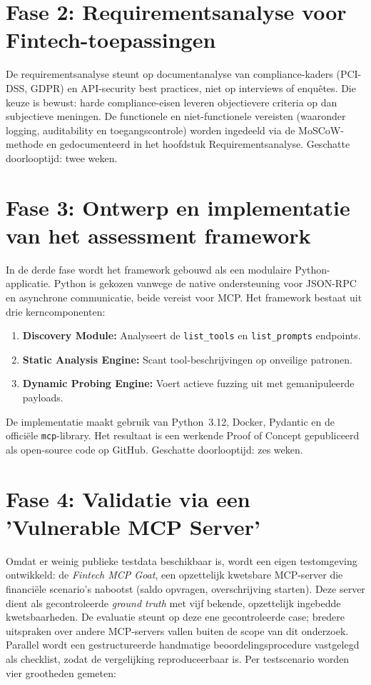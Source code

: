 \section{Fase 2: Requirementsanalyse voor Fintech-toepassingen}

De requirementsanalyse steunt op documentanalyse van compliance-kaders (PCI-DSS, GDPR) en API-security best practices, niet op interviews of enquêtes. Die keuze is bewust: harde compliance-eisen leveren objectievere criteria op dan subjectieve meningen. De functionele en niet-functionele vereisten (waaronder logging, auditability en toegangscontrole) worden ingedeeld via de MoSCoW-methode en gedocumenteerd in het hoofdstuk Requirementsanalyse. Geschatte doorlooptijd: twee weken.

\section{Fase 3: Ontwerp en implementatie van het assessment framework}

In de derde fase wordt het framework gebouwd als een modulaire Python-applicatie. Python is gekozen vanwege de native ondersteuning voor JSON-RPC en asynchrone communicatie, beide vereist voor MCP. Het framework bestaat uit drie kerncomponenten:

\begin{enumerate}
    \item \textbf{Discovery Module:} Analyseert de \texttt{list\_tools} en \texttt{list\_prompts} endpoints.
    \item \textbf{Static Analysis Engine:} Scant tool-beschrijvingen op onveilige patronen.
    \item \textbf{Dynamic Probing Engine:} Voert actieve fuzzing uit met gemanipuleerde payloads.
\end{enumerate}

De implementatie maakt gebruik van Python~3.12, Docker, Pydantic en de officiële \texttt{mcp}-library. Het resultaat is een werkende Proof of Concept gepubliceerd als open-source code op GitHub. Geschatte doorlooptijd: zes weken.

\section{Fase 4: Validatie via een 'Vulnerable MCP Server'}

Omdat er weinig publieke testdata beschikbaar is, wordt een eigen testomgeving ontwikkeld: de \emph{Fintech MCP Goat}, een opzettelijk kwetsbare MCP-server die financiële scenario's nabootst (saldo opvragen, overschrijving starten). Deze server dient als gecontroleerde \emph{ground truth} met vijf bekende, opzettelijk ingebedde kwetsbaarheden. De evaluatie steunt op deze ene gecontroleerde case; bredere uitspraken over andere MCP-servers vallen buiten de scope van dit onderzoek. Parallel wordt een gestructureerde handmatige beoordelingsprocedure vastgelegd als checklist, zodat de vergelijking reproduceerbaar is. Per testscenario worden vier grootheden gemeten:

